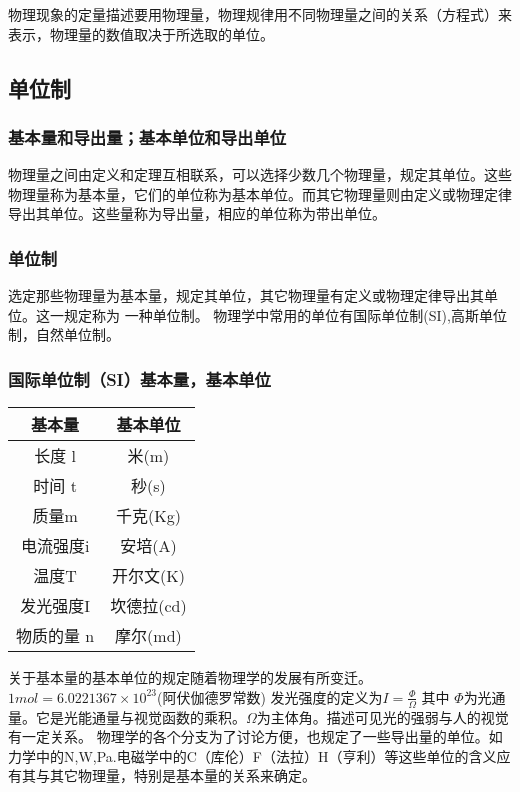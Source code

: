  物理现象的定量描述要用物理量，物理规律用不同物理量之间的关系（方程式）来表示，物理量的数值取决于所选取的单位。  
 \subsection{单位制 }
\subsubsection{基本量和导出量；基本单位和导出单位}
物理量之间由定义和定理互相联系，可以选择少数几个物理量，规定其单位。这些物理量称为基本量，它们的单位称为基本单位。而其它物理量则由定义或物理定律导出其单位。这些量称为导出量，相应的单位称为带出单位。  
\subsubsection{单位制}  选定那些物理量为基本量，规定其单位，其它物理量有定义或物理定律导出其单位。这一规定称为    一种单位制。  
物理学中常用的单位有国际单位制(SI),高斯单位制，自然单位制。
  
\subsubsection{国际单位制（SI）基本量，基本单位  }

\begin{center}
\begin{tabular}{|c|c|}\hline
基本量     &     基本单位  \\ \hline
长度  l  &          米(m)  \\ \hline
时间 t   &        秒(s)    \\  \hline
质量m  &           千克(Kg) \\  \hline
电流强度i   &      安培(A)  \\  \hline
温度T    &          开尔文(K)  \\  \hline
发光强度I    &      坎德拉(cd) \\   \hline
物质的量 n    &     摩尔(md)  \\    \hline
\end{tabular}
\end{center}
  
关于基本量的基本单位的规定随着物理学的发展有所变迁。  
 $ 1mol=6.0221367\times10^{23}$(阿伏伽德罗常数)    
 发光强度的定义为$I=\frac{\Phi}{\Omega}  $   其中 $\Phi$为光通量。它是光能通量与视觉函数的乘积。$\Omega$为主体角。描述可见光的强弱与人的视觉有一定关系。   
 物理学的各个分支为了讨论方便，也规定了一些导出量的单位。如力学中的N,W,Pa.电磁学中的C（库伦）F（法拉）H（亨利）等这些单位的含义应有其与其它物理量，特别是基本量的关系来确定。
  
